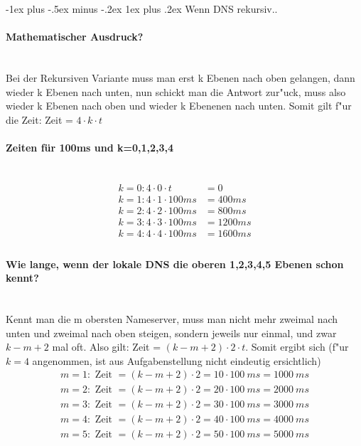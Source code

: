 \documentclass[10pt,landscape]{article}
\makeatletter
\renewcommand{\subsubsection}{\@startsection{subsubsection}{3}{0mm}%
                                {-1ex plus -.5ex minus -.2ex}%
                                {1ex plus .2ex}%
                                {\normalfont\small\bfseries}}
\makeatother
\begin{document}
\begin{multicols}{3}
\subsubsection{Wenn DNS rekursiv..}

\paragraph{Mathematischer Ausdruck?}\ \\
Bei der Rekursiven Variante muss man erst k Ebenen nach oben gelangen, dann wieder k Ebenen nach unten, 
nun schickt man die Antwort zur"uck, muss also wieder k Ebenen nach oben und wieder k Ebenenen nach unten.
Somit gilt f"ur die Zeit: Zeit = $4 \cdot k \cdot t$

\paragraph{Zeiten f\"ur 100ms und k=0,1,2,3,4} \ \\
\begin{align*}
    k = 0: 4 \cdot 0 \cdot t &= 0\\
    k = 1: 4 \cdot 1 \cdot 100ms  &= 400 ms\\
    k = 2: 4 \cdot 2 \cdot 100ms  &= 800 ms\\
    k = 3: 4 \cdot 3 \cdot 100ms  &= 1200 ms\\
    k = 4: 4 \cdot 4 \cdot 100ms  &= 1600 ms\\
\end{align*}


\paragraph{Wie lange, wenn der lokale DNS die oberen 1,2,3,4,5 Ebenen schon kennt?} \ \\ 
Kennt man die m obersten Nameserver, muss man nicht mehr zweimal nach unten und zweimal nach oben steigen, 
sondern jeweils nur einmal, und zwar $k-m+2$ mal oft. 
Also gilt: Zeit = $(k - m + 2) \cdot 2 \cdot t$. Somit ergibt sich 
(f"ur $k = 4$ angenommen, ist aus Aufgabenstellung nicht eindeutig ersichtlich)
\begin{align*}
    m = 1: \text{ Zeit } = (k - m + 2) \cdot 2 = 10 \cdot 100\ ms = 1000\ ms\\    
    m = 2: \text{ Zeit } = (k - m + 2) \cdot 2 = 20 \cdot 100\ ms = 2000\ ms\\
    m = 3: \text{ Zeit } = (k - m + 2) \cdot 2 = 30 \cdot 100\ ms = 3000\ ms\\
    m = 4: \text{ Zeit } = (k - m + 2) \cdot 2 = 40 \cdot 100\ ms = 4000\ ms\\
    m = 5: \text{ Zeit } = (k - m + 2) \cdot 2 = 50 \cdot 100\ ms = 5000\ ms
\end{align*}


\end{multicols}
\end{document}
